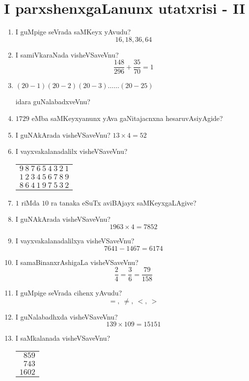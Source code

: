 \chapter{I parxshenxgaLanunx utatxrisi - {\rm II}}

\begin{enumerate}
\renewcommand{\labelenumi}{(\rm\theenumi)}
\item I guMpige seVrada saMKeyx yAvudu?
$$
16,18,36,64
$$

\item I samiVkaraNada visheVSaveVnu?
$$
\dfrac{148}{296}+\dfrac{35}{70}=1
$$

\item $(20-1)(20-2)(20-3)\ldots\ldots(20-25)$

idara guNalabadxveVnu?

\item $1729$ eMba saMKeyxyanunx yAva gaNitajacnxna hesaruvAsiyAgide?

\item I guNAkArada visheVSaveVnu? $13\times 4=52$

\item I vayxvakalanadalilx visheVSaveVnu?
\begin{center}
\begin{tabular}{l}
$9~8~7~6~5~4~3~2~1$\\
$1~2~3~4~5~6~7~8~9$\\
\hline
$8~6~4~1~9~7~5~3~2$
\end{tabular}
\end{center}

\item $1$ riMda $10$ ra tanaka eSuTx aviBAjayx saMKeyxgaLAgive?

\item I guNAkArada visheVSaveVnu?
$$
1963\times 4=7852
$$

\item I vayxvakalanadalilxya visheVSaveVnu?
$$
7641-1467=6174
$$

\item I samaBinanxrAshigaLa visheVSaveVnu?
$$
\dfrac{2}{4}=\dfrac{3}{6}=\dfrac{79}{158}
$$

\item I guMpige seVrada cihenx yAvudu?
$$
=, ~ \neq, ~ <, ~ >
$$

\item I guNalabadhxda visheVSaveVnu?
$$
139\times 109=15151
$$

\item I saMkalanada visheVSaveVnu?
\begin{center}
\begin{tabular}{r}
$859$\\
$743$\\
\hline
$1602$
\end{tabular}
\end{center}


\end{enumerate}
